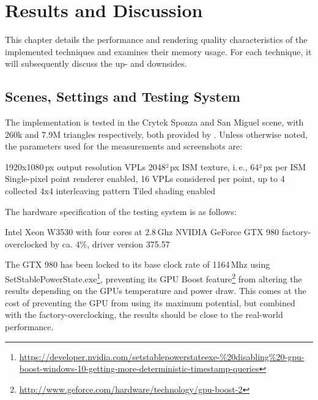 

\chapter{Results and Discussion}
\label{chap:results}

This chapter details the performance and rendering quality characteristics of the implemented techniques and examines their memory usage. For each technique, it will subsequently discuss the up- and downsides.

\section{Scenes, Settings and Testing System}
\label{sec:results:settings}

The implementation is tested in the Crytek Sponza and San Miguel scene, with 260k and 7.9M triangles respectively, both provided by \citet{McGuire2011Data}. Unless otherwise noted, the parameters used for the measurements and screenshots are:

\begin{outline}
    \1 1920x1080\,px output resolution
     VPLs
    \1 2048²\,px ISM texture, i.\,e., 64²\,px per ISM
    \1 Single-pixel point renderer enabled, 16 VPLs considered per point, up to 4 collected
    \1 4x4 interleaving pattern
    \1 Tiled shading enabled
\end{outline}

\noindent
The hardware specification of the testing system is as follows:

\begin{outline}
    \1 Intel Xeon W3530 with four cores at 2.8\,Ghz
    \1 NVIDIA GeForce GTX 980 factory-overclocked by ca. 4\%, driver version 375.57
\end{outline}

The GTX 980 has been locked to its base clock rate of 1164\,Mhz using SetStablePowerState.exe\footnote{\url{https://developer.nvidia.com/setstablepowerstateexe-\%20disabling\%20-gpu-boost-windows-10-getting-more-deterministic-timestamp-queries}}, preventing its GPU Boost feature\footnote{\url{http://www.geforce.com/hardware/technology/gpu-boost-2}} from altering the results depending on the GPUs temperature and power draw. This comes at the cost of preventing the GPU from using its maximum potential, but combined with the factory-overclocking, the results should be close to the real-world performance.

